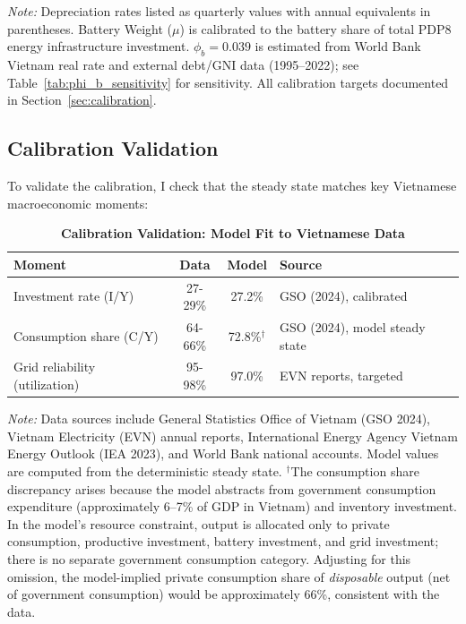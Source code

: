 \documentclass[12pt, a4paper]{article}
\begin{document}
\begin{table}[H]
    \parbox{\textwidth}{\footnotesize \textit{Note:} Depreciation rates listed as quarterly values with annual equivalents in parentheses. Battery Weight ($\mu$) is calibrated to the battery share of total PDP8 energy infrastructure investment. $\phi_b = 0.039$ is estimated from World Bank Vietnam real rate and external debt/GNI data (1995--2022); see Table~\ref{tab:phi_b_sensitivity} for sensitivity. All calibration targets documented in Section~\ref{sec:calibration}.}
\end{table}

\subsection{Calibration Validation}

To validate the calibration, I check that the steady state matches key Vietnamese macroeconomic moments:

\begin{table}[H]
    \centering
    \caption{\textbf{Calibration Validation: Model Fit to Vietnamese Data}}
    \label{tab:validation}
    \renewcommand{\arraystretch}{1.3}
    \begin{tabular}{l c c l}
        \toprule
        \textbf{Moment} & \textbf{Data} & \textbf{Model} & \textbf{Source} \\
        \midrule
        Investment rate (I/Y) & 27-29\% & 27.2\% & GSO (2024), calibrated \\
        Consumption share (C/Y) & 64-66\% & 72.8\%$^{\dagger}$ & GSO (2024), model steady state \\
        Grid reliability (utilization) & 95-98\% & 97.0\% & EVN reports, targeted \\
        \bottomrule
    \end{tabular}
    \vspace{0.2cm}
    \parbox{\textwidth}{\footnotesize \textit{Note:} Data sources include General Statistics Office of Vietnam (GSO 2024), Vietnam Electricity (EVN) annual reports, International Energy Agency Vietnam Energy Outlook (IEA 2023), and World Bank national accounts. Model values are computed from the deterministic steady state. $^{\dagger}$The consumption share discrepancy arises because the model abstracts from government consumption expenditure (approximately 6--7\% of GDP in Vietnam) and inventory investment. In the model's resource constraint, output is allocated only to private consumption, productive investment, battery investment, and grid investment; there is no separate government consumption category. Adjusting for this omission, the model-implied private consumption share of \textit{disposable} output (net of government consumption) would be approximately 66\%, consistent with the data.}
\end{table}
\end{document}
